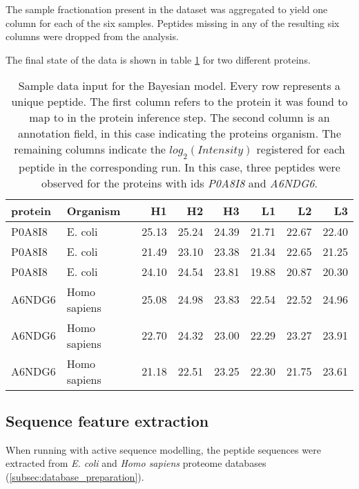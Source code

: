 The sample fractionation present in the dataset was aggregated to yield one column for each of the six samples. Peptides missing in any of the resulting six columns were dropped from the analysis.

The final state of the data is shown in table \ref{tab:data_model} for two different proteins.

\begin{table}
\begin{tabular}{llrrrrrr}
\toprule
protein &      Organism &     H1 &     H2 &     H3 &     L1 &     L2 &     L3 \\
\midrule
 P0A8I8 &       E. coli &  25.13 &  25.24 &  24.39 &  21.71 &  22.67 &  22.40 \\
 P0A8I8 &       E. coli &  21.49 &  23.10 &  23.38 &  21.34 &  22.65 &  21.25 \\
 P0A8I8 &       E. coli &  24.10 &  24.54 &  23.81 &  19.88 &  20.87 &  20.30 \\
 A6NDG6 &  Homo sapiens &  25.08 &  24.98 &  23.83 &  22.54 &  22.52 &  24.96 \\
 A6NDG6 &  Homo sapiens &  22.70 &  24.32 &  23.00 &  22.29 &  23.27 &  23.91 \\
 A6NDG6 &  Homo sapiens &  21.18 &  22.51 &  23.25 &  22.30 &  21.75 &  23.61 \\
\bottomrule
\end{tabular}
\caption[BayesQuant data input]{Sample data input for the Bayesian model. Every row represents a unique peptide. The first column refers to the protein it was found to map to in the protein inference step. The second column is an annotation field, in this case indicating the protein\textquotesingle s organism. The remaining columns indicate the $log_2(Intensity)$ registered for each peptide in the corresponding run. In this case, three peptides were observed for the proteins with ids \textit{P0A8I8} and \textit{A6NDG6}.}
\label{tab:data_model}
\end{table}

\subsection{Sequence feature extraction}

When running with active sequence modelling, the peptide sequences were extracted from \textit{E. coli} and \textit{Homo sapiens} proteome databases (\ref{subsec:database_preparation}).

